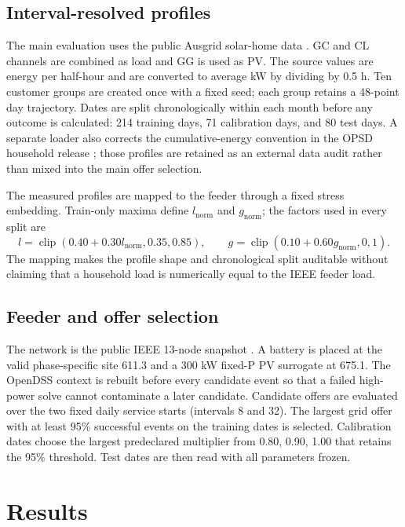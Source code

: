 \documentclass[11pt]{article}
\begin{document}
\subsection{Interval-resolved profiles}
The main evaluation uses the public Ausgrid solar-home data \cite{Ausgrid2011}. GC and CL channels are combined as load and GG is used as PV. The source values are energy per half-hour and are converted to average kW by dividing by 0.5 h. Ten customer groups are created once with a fixed seed; each group retains a 48-point day trajectory. Dates are split chronologically within each month before any outcome is calculated: 214 training days, 71 calibration days, and 80 test days. A separate loader also corrects the cumulative-energy convention in the OPSD household release \cite{OPSD2020}; those profiles are retained as an external data audit rather than mixed into the main offer selection.

The measured profiles are mapped to the feeder through a fixed stress embedding. Train-only maxima define $l_{\mathrm{norm}}$ and $g_{\mathrm{norm}}$; the factors used in every split are
\begin{equation}
l=\operatorname{clip}(0.40+0.30l_{\mathrm{norm}},0.35,0.85),\qquad
g=\operatorname{clip}(0.10+0.60g_{\mathrm{norm}},0,1).
\end{equation}
The mapping makes the profile shape and chronological split auditable without claiming that a household load is numerically equal to the IEEE feeder load.

\subsection{Feeder and offer selection}
The network is the public IEEE 13-node snapshot \cite{OpenDSS13}. A battery is placed at the valid phase-specific site 611.3 and a 300 kW fixed-P PV surrogate at 675.1. The OpenDSS context is rebuilt before every candidate event so that a failed high-power solve cannot contaminate a later candidate. Candidate offers are evaluated over the two fixed daily service starts (intervals 8 and 32). The largest grid offer with at least 95\% successful events on the training dates is selected. Calibration dates choose the largest predeclared multiplier from {0.80, 0.90, 1.00} that retains the 95\% threshold. Test dates are then read with all parameters frozen.

\section{Results}
\end{document}

